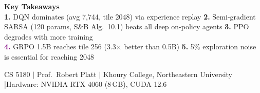 \documentclass[a4paper,11pt]{article}
\begin{document}
\begin{keybox}
\begin{center}
{\large\bfseries Key Takeaways}\\[4pt]
{\small
\textcolor{accent}{\textbf{1.}} DQN dominates (avg 7,744, tile 2048) via experience replay \quad
\textcolor{success}{\textbf{2.}} Semi-gradient SARSA (120 params, S\&B Alg.\ 10.1) beats all deep on-policy agents \quad
\textcolor{info}{\textbf{3.}} PPO degrades with more training\\
\textcolor{purple}{\textbf{4.}} GRPO 1.5B reaches tile 256 (3.3$\times$ better than 0.5B) \quad
\textcolor{danger}{\textbf{5.}} 5\% exploration noise is essential for reaching 2048
}
\end{center}
\end{keybox}

\vspace{2pt}
\begin{center}
{\footnotesize\color{gray} CS 5180 $|$ Prof.\ Robert Platt $|$ Khoury College, Northeastern University \quad|\quad Hardware: NVIDIA RTX 4060 (8\,GB), CUDA 12.6}
\end{center}
\end{document}
